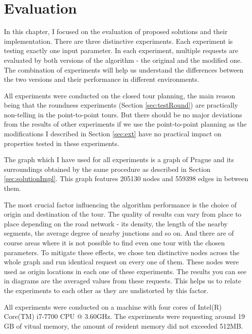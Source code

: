 \documentclass{ctuthesis}
\begin{document}
\chapter{Evaluation} \label{chap:performance}
In this chapter, I focused on the evaluation of proposed solutions and their implementation. There are three distinctive experiments. Each experiment is testing exactly one input parameter. In each experiment, multiple requests are evaluated by both versions of the algorithm - the original and the modified one. The combination of experiments will help us understand the differences between the two versions and their performance in different environments.\par All experiments were conducted on the closed tour planning, the main reason being that the roundness experiments (Section \ref{sec:testRound}) are practically non-telling in the point-to-point tours. But there should be no major deviations from the results of other experiments if we use the point-to-point planning as the modifications I described in Section \ref{sec:ext} have no practical impact on properties tested in these experiments. \par The graph which I have used for all experiments is a graph of Prague and its surroundings obtained by the same procedure as described in Section \ref{sec:solutionImpl}. This graph features 205130 nodes and 559398 edges in between them. \par The most crucial factor influencing the algorithm performance is the choice of origin and destination of the tour. The quality of results can vary from place to place depending on the road network - its density, the length of the nearby segments, the average degree of nearby junctions and so on. And there are of course areas where it is not possible to find even one tour with the chosen parameters. To mitigate these effects, we chose ten distinctive nodes across the whole graph and run identical request on every one of them. These nodes were used as origin locations in each one of these experiments. The results you can see in diagrams are the averaged values from these requests. This helps us to relate the experiments to each other as they are undistorted by this factor.\par All experiments were conducted on a machine with four cores of Intel(R) Core(TM) i7-7700 CPU @ 3.60GHz. The experiments were requesting around 19 GB of vitual memory, the amount of resident memory did not exceeded 512MB. \par
\end{document}
